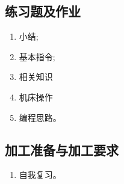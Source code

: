 \subsection{练习题及作业}
\begin{enumerate}[1、]
	\item 小结;
	\item 基本指令;
	\item 相关知识
	\item 机床操作
	\item 编程思路。
\end{enumerate}

\vfill
\subsection{加工准备与加工要求}
\begin{enumerate}[1、]
	\item 自我复习。
\end{enumerate}
\vfill